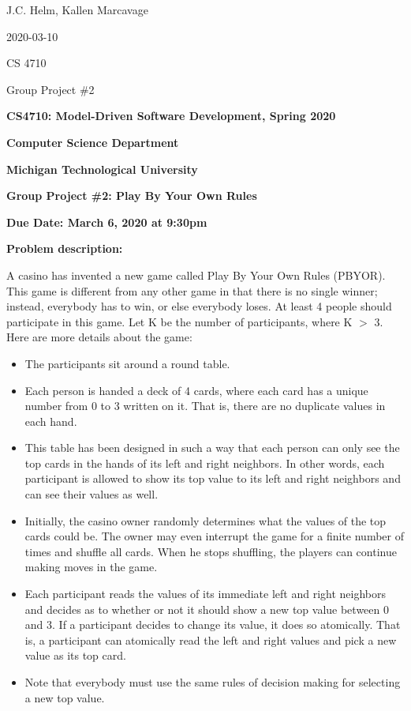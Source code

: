 \documentclass[a4paper,portrait,12pt]{article}
\begin{document}
	
\begin{flushright}
	\hfill J.C. Helm, Kallen Marcavage
	
	\hfill 2020-03-10 
	
	\hfill CS 4710 
	
	\hfill Group Project \#2
\end{flushright}

\begin{center}
	\textbf{CS4710: Model-Driven Software Development, Spring 2020}

	\textbf{Computer Science Department}

	\textbf{Michigan Technological University}

	\textbf{Group Project \#2: Play By Your Own Rules}

	\textbf{Due Date: March 6, 2020 at 9:30pm}
\end{center}


\begin{flushleft}
\textbf{Problem description:}
\end{flushleft}


\begin{flushleft}
A casino has invented a new game called Play By Your Own Rules (PBYOR). This game is different from any other game in that there is no single winner; instead, everybody has to win, or else everybody loses. At least 4 people should participate in this game. Let K be the number of participants, where K $>$ 3. Here are more details about the game:
\end{flushleft}


\begin{itemize}
	\item The participants sit around a round table.
	\item Each person is handed a deck of 4 cards, where each card has a unique number from 0 to 3 written on it. That is, there are no duplicate values in each hand.
	\item This table has been designed in such a way that each person can only see the top cards in the hands of its left and right neighbors. In other words, each participant is allowed to show its top value to its left and right neighbors and can see their values as well.
	\item Initially, the casino owner randomly determines what the values of the top cards could be. The owner may even interrupt the game for a finite number of times and shuffle all cards. When he stops shuffling, the players can continue making moves in the game.
	\item Each participant reads the values of its immediate left and right neighbors and decides as to whether or not it should show a new top value between 0 and 3. If a participant decides to change its value, it does so atomically. That is, a participant can atomically read the left and right values and pick a new value as its top card.
	\item Note that everybody must use the same rules of decision making for selecting a new top value.
\end{itemize}
\end{document}

